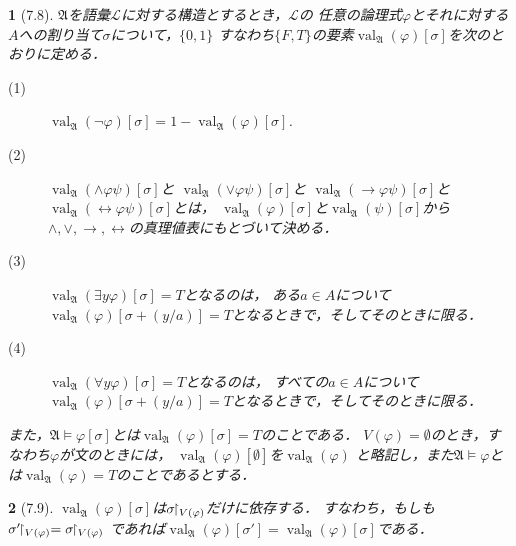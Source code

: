 \documentclass[a4j,10.5pt,oneside,openany]{jsbook}
\theoremstyle{mystyle}
\newtheorem{thm}{\color{DarkMidnightBlue}{定理}}[section]
\newtheorem{dfn}[thm]{\color{PakistanGreen}{定義}}
\newcommand{\val}{\operatorname{val}} %
\newcommand{\rest}[2]{#1\hspace{-0.41em}\upharpoonright_{#2}} %
\begin{document}
	\begin{screen}
		\begin{dfn}[7.8]
			$\mathfrak{A}$を語彙$\mathcal{L}$に対する構造とするとき，$\mathcal{L}$の
			任意の論理式$\varphi$とそれに対する$A$への割り当て$\sigma$について，$\{0,1\}$
			すなわち$\{F,T\}$の要素$\val_{\mathfrak{A}}(\varphi)[\sigma]$を次のとおりに定める．
			\begin{description}
				\item[(1)] $\val_{\mathfrak{A}}(\neg \varphi)[\sigma]
					= 1 - \val_{\mathfrak{A}}(\varphi)[\sigma]$.
				\item[(2)] $\val_{\mathfrak{A}}(\wedge \varphi \psi)[\sigma]$と
					$\val_{\mathfrak{A}}(\vee \varphi \psi)[\sigma]$と
					$\val_{\mathfrak{A}}(\rightarrow \varphi \psi)[\sigma]$と
					$\val_{\mathfrak{A}}(\leftrightarrow \varphi \psi)[\sigma]$とは，
					$\val_{\mathfrak{A}}(\varphi)[\sigma]$と$\val_{\mathfrak{A}}(\psi)[\sigma]$から$\wedge,\vee,\rightarrow,\leftrightarrow$の真理値表にもとづいて決める．
				\item[(3)] $\val_{\mathfrak{A}}(\exists y \varphi)[\sigma] = T$となるのは，
					ある$a \in A$について$\val_{\mathfrak{A}}(\varphi)[\sigma + (y/a)]
					= T$となるときで，そしてそのときに限る．
				\item[(4)] $\val_{\mathfrak{A}}(\forall y \varphi)[\sigma] = T$となるのは，
					すべての$a \in A$について$\val_{\mathfrak{A}}(\varphi)[\sigma + (y/a)]
					= T$となるときで，そしてそのときに限る．
			\end{description}
			また，$\mathfrak{A} \models \varphi[\sigma]$とは$\val_{\mathfrak{A}}(\varphi)[\sigma] = T$のことである．
			$V(\varphi) = \emptyset$のとき，すなわち$\varphi$が文のときには，
			$\val_{\mathfrak{A}}(\varphi)[\emptyset]$を$\val_{\mathfrak{A}}(\varphi)$
			と略記し，また$\mathfrak{A} \models \varphi$とは$\val_{\mathfrak{A}}(\varphi)
			= T$のことであるとする．
		\end{dfn}
	\end{screen}
	
	\begin{screen}
		\begin{thm}[7.9]
			$\val_{\mathfrak{A}}(\varphi)[\sigma]$は$\rest{\sigma}{V(\varphi)}$だけに依存する．
			すなわち，もしも$\rest{\sigma'}{V(\varphi)} = \rest{\sigma}{V(\varphi)}$
			であれば$\val_{\mathfrak{A}}(\varphi)[\sigma'] = \val_{\mathfrak{A}}(\varphi)[\sigma]$である．
		\end{thm}
	\end{screen}
	
\end{document}
